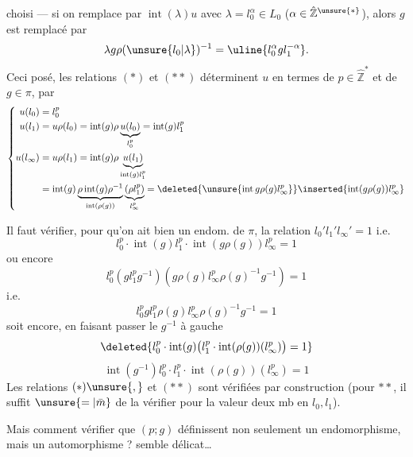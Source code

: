choisi --- si on  remplace  par $\operatorname{int}(\lambda)u$ avec $\lambda=l_0^\alpha\in L_0$ ($\alpha\in\hat{\mathbb Z}^{\unsure{*}}$), alors $g$ est remplacé par
\[
\lambda g\rho(\unsure{l_0|\lambda})^{-1}=\uline{l_0^\alpha gl_1^{-\alpha}}.
\]
Ceci posé,  les relations $(*)$ et $(**)$ déterminent $u$ en termes de $p\in\hat{\mathbb Z}^{*}$ et de $g\in\pi$, par
\[
\left\{\begin{aligned}
u(l_0)&=l_0^p\\
u(l_1)&=u\rho(l_0)=\operatorname{int}(g)\rho\underbrace{u(l_0)}_{l_0^p}=\operatorname{int}(g)l_1^p\\
u(l_\infty)&=u\rho(l_1)=\operatorname{int}(g)\rho\underbrace{u(l_1)}_{\operatorname{int}(g)l_1^p}\\
&=\operatorname{int}(g)\underbrace{\rho\operatorname{int}(g)\rho^{-1}}_{\operatorname{int}(\rho(g))}\underbrace{(\rho l_1^p)}_{l_\infty^p}
=\deleted{\unsure{\operatorname{int}g\rho(g)l_\infty^p}}\inserted{\operatorname{int}(g\rho(g))l_\infty^p}
\end{aligned}\right.
\]

Il faut vérifier, pour qu'on ait bien un endom. de $\pi$, la relation $l_0'l_1'l_\infty'=1$ i.e.
\[
\boxed{l_0^p\cdot\operatorname{int}(g)l_1^p\cdot\operatorname{int}(g\rho(g))l_\infty^p=1}
\]
ou encore
\[
l_0^p(gl_1^pg^{-1})(g\rho(g)l_\infty^p\rho(g)^{-1}g^{-1})=1
\]
i.e.
\[
l_0^pgl_1^p\rho(g)l_\infty^p\rho(g)^{-1}g^{-1}=1
\]
soit encore, en faisant passer le $g^{-1}$ à gauche
\[
\deleted{l_0^p\cdot\operatorname{int}(g)\bigl(l_1^p\cdot\operatorname{int}(\rho(g))(l_\infty^p)\bigr)=1}
\]
\[
\operatorname{int}(g^{-1})l_0^p\cdot l_1^p\cdot\operatorname{int}(\rho(g))(l_\infty^p)=1
\]
Les relations $(*)\unsure{,}$ et $(**)$ sont vérifiées par construction (pour $**$, il suffit $\unsure{=|\bar m}$ de la vérifier pour la valeur  deux mb en $l_0,l_1$).

Mais comment vérifier que $(p;g)$ définissent non seulement un endomorphisme, mais un automorphisme ?  semble délicat\ldots

